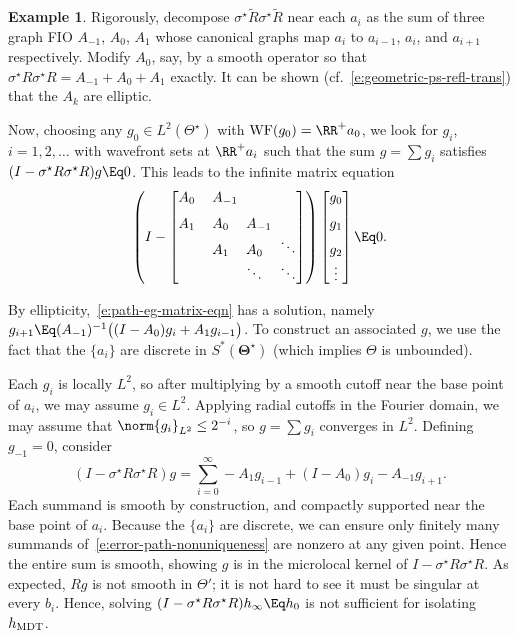 \documentclass[10pt]{article}
\theoremstyle{plain}
\theoremstyle{definition}
\newtheorem{example}{Example}
\theoremstyle{remark}
\numberwithin{theorem}{section}
\numberwithin{example}{section}
\numberwithin{equation}{section}
\numberwithin{figure}{section}
\newcommand\bTheta{\boldsymbol\Theta}
\DeclareMathOperator\WF{WF}		%
\newcommand\MDT{\ensuremath{_{\text{\normalfont MDT}}}}	%
\newcommand\eqml{\Eq}					%
\begin{document}
\begin{example}
Rigorously, decompose $\sigma^\star \tilde R\sigma^\star\tilde R$ near each $a_i$ as the sum of three graph FIO $A_{-1}$, $A_0$, $A_1$ whose canonical graphs map $a_i$ to $a_{i-1}$, $a_i$, and $a_{i+1}$ respectively. Modify $A_0$, say, by a smooth operator so that $\sigma^\star R\sigma^\star R=A_{-1}+A_0+A_1$ exactly. It can be shown (cf.~\eqref{e:geometric-ps-refl-trans}) that the $A_k$ are elliptic. 

Now, choosing any $g_0\in L^2(\Theta^\star)$ with $\WF(g_0)=\RR^+ a_0$, we look for $g_i$, $i=1,2,\dotsc$ with wavefront sets at $\RR^+a_i$ such that the sum $g=\sum g_i$ satisfies $(I-\sigma^\star R\sigma^\star R)g\eqml 0$. This leads to the infinite matrix equation
\begin{equation}
	\setlength\arraycolsep{3pt}
	\left(
	I -
	\begin{bmatrix*}[l]
		A_0				& A_{-1}	&		&  \\
		A_1				& A_0	& A_{-1}	& \phantom\ddots\\
		\phantom{A_{-1}}	& A_1	& A_0	& \ddots\\
						&		& \ddots	& \ddots
	\end{bmatrix*}
	\right)
	\begin{bmatrix}
		g_0				\\
		g_1 \vphantom\vdots \\
		g_2 \vphantom\vdots \\
		\vdots
	\end{bmatrix}
	\eqml
	0.
	\label{e:path-eg-matrix-eqn}
\end{equation}

By ellipticity,~\eqref{e:path-eg-matrix-eqn} has a solution, namely $g_{i+1} \eqml (A_{-1})^{-1} \big((I-A_0)g_i+A_1g_{i-1}\big)$. To construct an associated $g$, we use the fact that the $\{a_i\}$ are discrete in $S^*(\bTheta^\star)$ (which implies $\Theta$ is unbounded). 

Each $g_i$ is locally $L^2$, so after multiplying by a smooth cutoff near the base point of $a_i$, we may assume $g_i\in L^2$. Applying radial cutoffs in the Fourier domain, we may assume that $\norm{g_i}_{L^2}\leq 2^{-i}$, so $g=\sum g_i$ converges in $L^2$. Defining $g_{-1}=0$, consider
\begin{equation}
	(I - \sigma^\star R\sigma^\star R)g = \sum_{i=0}^\infty - A_{1}g_{i-1} + (I-A_0)g_i - A_{-1}g_{i+1}.
	\label{e:error-path-nonuniqueness}
\end{equation}
Each summand is smooth by construction, and compactly supported near the base point of $a_i$. Because the $\{a_i\}$ are discrete, we can ensure only finitely many summands of~\eqref{e:error-path-nonuniqueness} are nonzero at any given point. Hence the entire sum is smooth, showing $g$ is in the microlocal kernel of $I-\sigma^\star R\sigma^\star R$. As expected, $Rg$ is not smooth in $\Theta'$; it is not hard to see it must be singular at every $b_i$. Hence, solving $(I-\sigma^\star R\sigma^\star R)h_\infty\eqml h_0$ is not sufficient for isolating $h\MDT$.

\label{x:ml-nonuniqueness-2}
\end{example}
\end{document}
